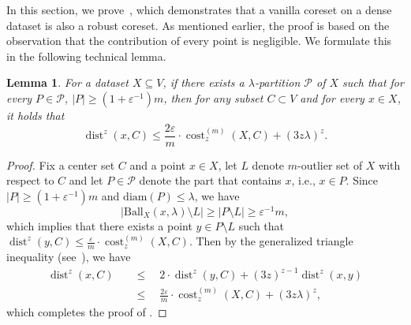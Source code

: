 \documentclass[letterpaper,11pt]{article}
\theoremstyle{plain}
\newtheorem{lemma}[theorem]{Lemma}
\theoremstyle{definition}
\theoremstyle{remark}
\DeclareMathOperator{\cost}{cost}
\DeclareMathOperator{\dist}{dist}
\newcommand{\diam}{\mathrm{diam}}
\newcommand{\eps}{\varepsilon}
\newcommand{\calP}{\mathcal{P}}
\newcommand{\ball}{\mathrm{Ball}}
\begin{document}
In this section, we prove~, which demonstrates that a vanilla coreset on a dense dataset is also a robust coreset. As mentioned earlier, the proof is based on the observation that the contribution of every point is negligible. We formulate this in the following technical lemma.

\begin{lemma}
    \label{lem:small dist}
For a dataset $X\subseteq V$, if there exists a $\lambda$-partition $\calP$ of $X$ such that for every $P\in\calP$, $|P|\ge (1+\eps^{-1})m$, then
    for any subset $C\subset V$ and for every $x\in X$, it holds that 
    \begin{equation*}
        \dist^z(x,C)\le \frac{2\eps}{m}\cdot \cost_z^{(m)}(X,C) + (3z\lambda)^z.
    \end{equation*}
\end{lemma}
\begin{proof}
    Fix a center set $C$ and a point $x\in X$, let $L$ denote $m$-outlier set of $X$ with respect to $C$ and let $P\in \calP$ denote the part that contains $x$, i.e., $x\in P$. Since $|P|\ge (1+\eps^{-1})m$ and $\diam(P)\le \lambda$, we have
    \begin{equation*}
        \left|\ball_X(x,\lambda)\setminus L \right|\ge \left|P\setminus L \right|\ge \eps^{-1}m,
    \end{equation*} 
    which implies that there exists a point $y\in P\setminus L$ such that $\dist^z(y,C)\le \frac{\eps}{m}\cdot\cost_z^{(m)}(X,C)$.
    Then by the generalized triangle inequality (see~), we have 
    \begin{align*}
        \dist^z(x,C)\quad&\le\quad 2\cdot \dist^z(y,C) + \left(3z \right)^{z-1} \dist^z(x,y)\\
        &\le\quad \frac{2\eps}{m}\cdot \cost_z^{(m)}(X,C) +  \left(3z\lambda \right)^z,
    \end{align*}
    which completes the proof of .
\end{proof}
\end{document}

